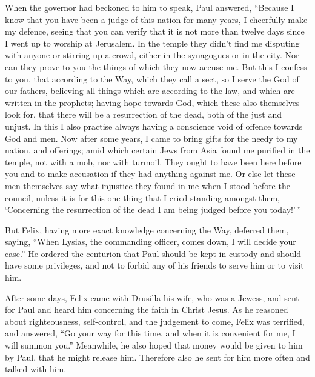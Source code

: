  When the governor had beckoned to him to speak, Paul
answered, ``Because I know that you have been a judge of this nation for
many years, I cheerfully make my defence,  seeing that
you can verify that it is not more than twelve days since I went up to
worship at Jerusalem.  In the temple they didn't find me
disputing with anyone or stirring up a crowd, either in the synagogues
or in the city.  Nor can they prove to you the things of
which they now accuse me.  But this I confess to you,
that according to the Way, which they call a sect, so I serve the God of
our fathers, believing all things which are according to the law, and
which are written in the prophets;  having hope towards
God, which these also themselves look for, that there will be a
resurrection of the dead, both of the just and unjust. 
In this I also practise always having a conscience void of offence
towards God and men.  Now after some years, I came to
bring gifts for the needy to my nation, and offerings; 
amid which certain Jews from Asia found me purified in the temple, not
with a mob, nor with turmoil.  They ought to have been
here before you and to make accusation if they had anything against me.
 Or else let these men themselves say what injustice they
found in me when I stood before the council,  unless it
is for this one thing that I cried standing amongst them, `Concerning
the resurrection of the dead I am being judged before you today!'\,''

 But Felix, having more exact knowledge concerning the
Way, deferred them, saying, ``When Lysias, the commanding officer, comes
down, I will decide your case.''  He ordered the
centurion that Paul should be kept in custody and should have some
privileges, and not to forbid any of his friends to serve him or to
visit him.

 After some days, Felix came with Drusilla his wife, who
was a Jewess, and sent for Paul and heard him concerning the faith in
Christ Jesus.  As he reasoned about righteousness,
self-control, and the judgement to come, Felix was terrified, and
answered, ``Go your way for this time, and when it is convenient for me,
I will summon you.''  Meanwhile, he also hoped that money
would be given to him by Paul, that he might release him. Therefore also
he sent for him more often and talked with him.

